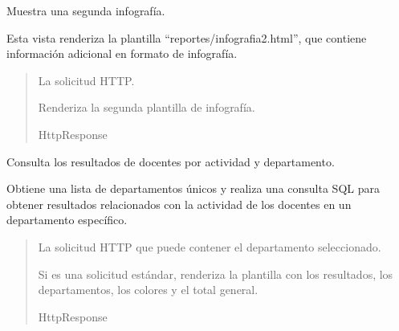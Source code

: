 \documentclass[letterpaper,10pt,spanish]{sphinxmanual}
\begin{document}
\begin{fulllineitems}

\pysigstartsignatures
{}
\pysigstopsignatures
\sphinxAtStartPar
Muestra una segunda infografía.

\sphinxAtStartPar
Esta vista renderiza la plantilla “reportes/infografia2.html”,
que contiene información adicional en formato de infografía.
\begin{quote}\begin{description}
\sphinxAtStartPar
{} \textendash{} La solicitud HTTP.

\sphinxAtStartPar
Renderiza la segunda plantilla de infografía.

\sphinxAtStartPar
HttpResponse

\end{description}\end{quote}

\end{fulllineitems}



\begin{fulllineitems}

\pysigstartsignatures
{}
\pysigstopsignatures
\sphinxAtStartPar
Consulta los resultados de docentes por actividad y departamento.

\sphinxAtStartPar
Obtiene una lista de departamentos únicos y realiza una consulta SQL para obtener
resultados relacionados con la actividad de los docentes en un departamento específico.
\begin{quote}\begin{description}
\sphinxAtStartPar
{} \textendash{} La solicitud HTTP que puede contener el departamento seleccionado.

\sphinxAtStartPar
\begin{description}
\sphinxAtStartPar
Si es una solicitud estándar, renderiza la plantilla con los resultados,
los departamentos, los colores y el total general.

\end{description}


\sphinxAtStartPar
HttpResponse

\end{description}\end{quote}

\end{fulllineitems}
\end{document}
